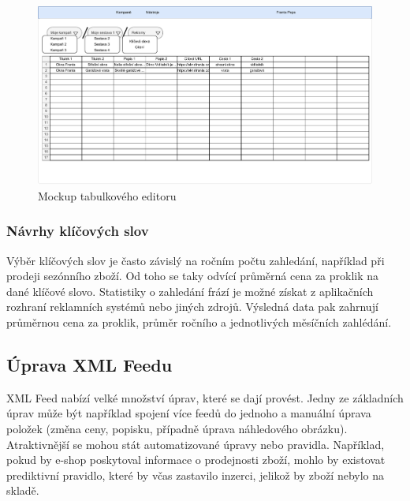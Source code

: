 \begin{figure}[h]
    \centering
    \includegraphics[width=1\textwidth]{Figures/datagrid-mockup.pdf}
    \caption{Mockup tabulkového editoru}
    \label{fig:datagrid-mockup}
\end{figure}

\subsubsection{Návrhy klíčových slov}
Výběr klíčových slov je často závislý na ročním počtu zahledání, například při prodeji sezónního zboží. Od toho se taky odvící průměrná cena za proklik
na dané klíčové slovo. Statistiky o zahledání frází je možné získat z aplikačních rozhraní reklamních systémů nebo jiných zdrojů. Výsledná data pak zahrnují
průměrnou cena za proklik, průměr ročního a jednotlivých měsíčních zahlédání.


\subsection{Úprava XML Feedu}
XML Feed nabízí velké množství úprav, které se dají provést. Jedny ze základních úprav může být například spojení více feedů do jednoho a manuální
úprava položek (změna ceny, popisku, případně úprava náhledového obrázku). Atraktivnější se mohou stát automatizované úpravy nebo pravidla. Například, pokud by
e-shop poskytoval informace o prodejnosti zboží, mohlo by existovat prediktivní pravidlo, které by včas zastavilo inzerci, jelikož by zboží nebylo na skladě.



\endinput